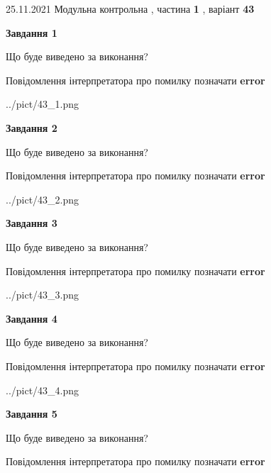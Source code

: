 \documentclass[10pt, ukrainian]{article}
\begin{document}
{25.11.2021 Модульна контрольна , частина \textbf { 1 }, варіант  \No \textbf { 43 }\par}
{
\begin {large}

{\begin {center}\textbf{Завдання 1}\end {center}}\par
Що буде виведено за виконання? \par
Повідомлення інтерпретатора про помилку позначати \textbf{error}

\begin{center}
	{../pict/43_1.png}
\end{center}
\newpage

{\begin {center}\textbf{Завдання 2}\end {center}}\par
Що буде виведено за виконання? \par
Повідомлення інтерпретатора про помилку позначати \textbf{error}

\begin{center}
	{../pict/43_2.png}
\end{center}
\newpage

{\begin {center}\textbf{Завдання 3}\end {center}}\par
Що буде виведено за виконання? \par
Повідомлення інтерпретатора про помилку позначати \textbf{error}

\begin{center}
	{../pict/43_3.png}
\end{center}
\newpage

{\begin {center}\textbf{Завдання 4}\end {center}}\par
Що буде виведено за виконання? \par
Повідомлення інтерпретатора про помилку позначати \textbf{error}

\begin{center}
	{../pict/43_4.png}
\end{center}
\newpage

{\begin {center}\textbf{Завдання 5}\end {center}}\par
Що буде виведено за виконання? \par
Повідомлення інтерпретатора про помилку позначати \textbf{error}


\end{large}}
\end{document}

